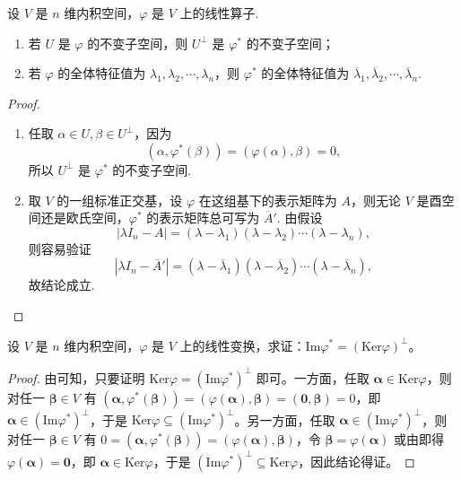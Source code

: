 \documentclass[../../main.tex]{subfiles}%
\begin{document}
\begin{proposition}\label{proposition:线性算子的正交补空间就是伴随算子的不变子空间}
设 $V$ 是 $n$ 维内积空间，$\varphi$ 是 $V$ 上的线性算子.
\begin{enumerate}[(1)]
\item 若 $U$ 是 $\varphi$ 的不变子空间，则 $U^{\perp}$ 是 $\varphi^*$ 的不变子空间；

\item 若 $\varphi$ 的全体特征值为 $\lambda_1,\lambda_2,\cdots,\lambda_n$，则 $\varphi^*$ 的全体特征值为 $\overline{\lambda}_1,\overline{\lambda}_2,\cdots,\overline{\lambda}_n$.
\end{enumerate}
\end{proposition}
\begin{proof}
\begin{enumerate}[(1)]
\item 任取 $\alpha \in U, \beta \in U^{\perp}$，因为
\[
(\alpha,\varphi^*(\beta)) = (\varphi(\alpha),\beta) = 0,
\]
所以 $U^{\perp}$ 是 $\varphi^*$ 的不变子空间.

\item 取 $V$ 的一组标准正交基，设 $\varphi$ 在这组基下的表示矩阵为 $A$，则无论 $V$ 是酉空间还是欧氏空间，$\varphi^*$ 的表示矩阵总可写为 $\overline{A}'$. 由假设
\[
|\lambda I_n - A| = (\lambda - \lambda_1)(\lambda - \lambda_2)\cdots(\lambda - \lambda_n),
\]
则容易验证
\[
|\lambda I_n - \overline{A}'| = (\lambda - \overline{\lambda}_1)(\lambda - \overline{\lambda}_2)\cdots(\lambda - \overline{\lambda}_n),
\]
故结论成立.
\end{enumerate}

\end{proof}

\begin{proposition}\label{proposition:例9.27}
设 $V$ 是 $n$ 维内积空间，$\varphi$ 是 $V$ 上的线性变换，求证：$\mathrm{Im}\varphi^* = (\mathrm{Ker}\varphi)^\perp$。
\end{proposition}
\begin{proof}

由可知，只要证明 $\mathrm{Ker}\varphi = (\mathrm{Im}\varphi^*)^\perp$ 即可。一方面，任取 $\boldsymbol{\alpha} \in \mathrm{Ker}\varphi$，则对任一 $\boldsymbol{\beta} \in V$ 有 $(\boldsymbol{\alpha}, \varphi^*(\boldsymbol{\beta})) = (\varphi(\boldsymbol{\alpha}), \boldsymbol{\beta}) = (\boldsymbol{0}, \boldsymbol{\beta}) = 0$，即 $\boldsymbol{\alpha} \in (\mathrm{Im}\varphi^*)^\perp$，于是 $\mathrm{Ker}\varphi \subseteq (\mathrm{Im}\varphi^*)^\perp$。另一方面，任取 $\boldsymbol{\alpha} \in (\mathrm{Im}\varphi^*)^\perp$，则对任一 $\boldsymbol{\beta} \in V$ 有 $0 = (\boldsymbol{\alpha}, \varphi^*(\boldsymbol{\beta})) = (\varphi(\boldsymbol{\alpha}), \boldsymbol{\beta})$，令 $\boldsymbol{\beta} = \varphi(\boldsymbol{\alpha})$ 或由即得 $\varphi(\boldsymbol{\alpha}) = \boldsymbol{0}$，即 $\boldsymbol{\alpha} \in \mathrm{Ker}\varphi$，于是 $(\mathrm{Im}\varphi^*)^\perp \subseteq \mathrm{Ker}\varphi$，因此结论得证。

\end{proof}
\end{document}
